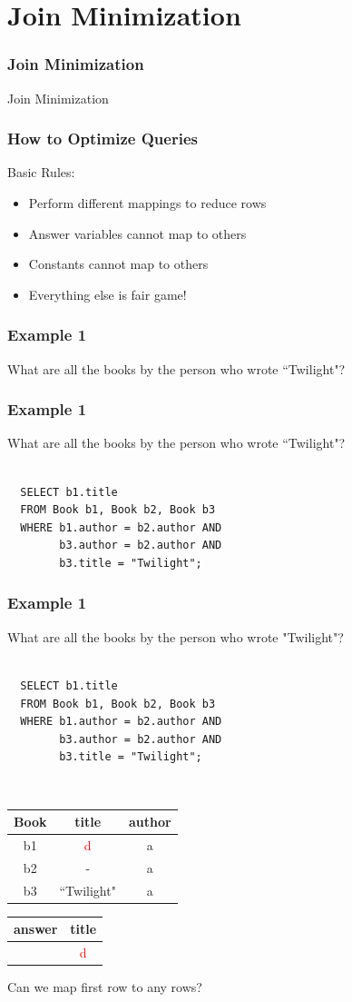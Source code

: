 \documentclass{beamer}
\begin{document}
\section{Join Minimization}
\begin{frame}
  \frametitle{Join Minimization}
  \begin{itemize}
  Join Minimization
  \end{itemize}
\end{frame}
\begin{frame}
  \frametitle{How to Optimize Queries}
  Basic Rules:
  \begin{itemize}
    \item Perform different mappings to reduce rows
    \item Answer variables cannot map to others
    \item Constants cannot map to others
    \item Everything else is fair game!
  \end{itemize}
\end{frame}

\begin{frame}
  \frametitle{Example 1}
  What are all the books by the person who wrote ``Twilight"?
\end{frame}

\begin{frame}[fragile]
  \frametitle{Example 1}
  What are all the books by the person who wrote ``Twilight"?\\
  \hfill \\
\begin{verbatim} 
  SELECT b1.title
  FROM Book b1, Book b2, Book b3
  WHERE b1.author = b2.author AND
        b3.author = b2.author AND
        b3.title = "Twilight";
\end{verbatim}

\end{frame}

\begin{frame}[fragile]
  \frametitle{Example 1}
  What are all the books by the person who wrote "Twilight"?\\
  \hfill \\
\begin{verbatim} 
  SELECT b1.title
  FROM Book b1, Book b2, Book b3
  WHERE b1.author = b2.author AND
        b3.author = b2.author AND
        b3.title = "Twilight";
\end{verbatim}
  \hfill \\
  \begin{tabular}{ c | c c }
  Book & title & author \\
  \hline
   b1 & \textcolor{red}{d} & a \\
   b2 & -         & a \\
   b3 & ``Twilight" & a \\
  \end{tabular}
  \begin{tabular}{ c | c}
  answer & title \\
  \hline
   & \textcolor{red}{d}\\
  \end{tabular}

  Can we map first row to any rows?
\end{frame}
\end{document}
